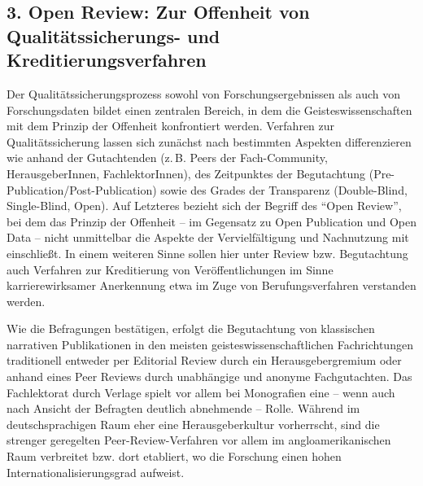 \documentclass[a4paper,
fontsize=11pt,
oneside,
numbers=noperiodatend,
parskip=half-,
bibliography=totoc,
final
]{scrartcl}
\begin{document}
\subsection{3. Open Review: Zur Offenheit von Qualitätssicherungs- und
Kreditierungsverfahren}\label{open-review-zur-offenheit-von-qualituxe4tssicherungs--und-kreditierungsverfahren}

Der Qualitätssicherungsprozess sowohl von Forschungsergebnissen als auch
von Forschungsdaten bildet einen zentralen Bereich, in dem die
Geisteswissenschaften mit dem Prinzip der Offenheit konfrontiert werden.
Verfahren zur Qualitätssicherung lassen sich zunächst nach bestimmten
Aspekten differenzieren wie anhand der Gutachtenden (z.\,B. Peers der
Fach-Community, HerausgeberInnen, FachlektorInnen), des Zeitpunktes der
Begutachtung (Pre-Publication/Post-Publication) sowie des Grades der
Transparenz (Double-Blind, Single-Blind, Open). Auf Letzteres bezieht
sich der Begriff des \enquote{Open Review}, bei dem das Prinzip der
Offenheit -- im Gegensatz zu Open Publication und Open Data -- nicht
unmittelbar die Aspekte der Vervielfältigung und Nachnutzung mit
einschließt. In einem weiteren Sinne sollen hier unter Review bzw.
Begutachtung auch Verfahren zur Kreditierung von Veröffentlichungen im
Sinne karrierewirksamer Anerkennung etwa im Zuge von Berufungsverfahren
verstanden werden.

Wie die Befragungen bestätigen, erfolgt die Begutachtung von klassischen
narrativen Publikationen in den meisten geisteswissenschaftlichen
Fachrichtungen traditionell entweder per Editorial Review durch ein
Herausgebergremium oder anhand eines Peer Reviews durch unabhängige und
anonyme Fachgutachten. Das Fachlektorat durch Verlage spielt vor allem
bei Monografien eine -- wenn auch nach Ansicht der Befragten deutlich
abnehmende -- Rolle. Während im deutschsprachigen Raum eher eine
Herausgeberkultur vorherrscht, sind die strenger geregelten
Peer-Review-Verfahren vor allem im angloamerikanischen Raum verbreitet
bzw. dort etabliert, wo die Forschung einen hohen
Internationalisierungsgrad aufweist.
\end{document}
